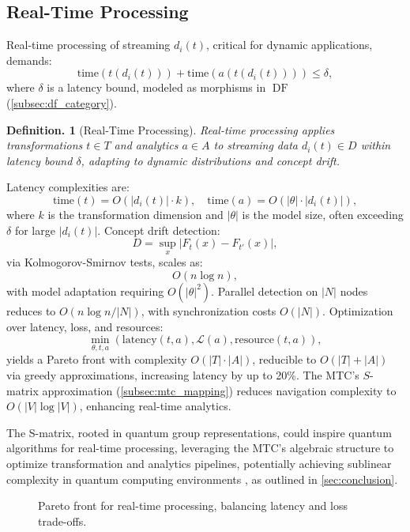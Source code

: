 \documentclass{amsart}
\newtheorem{defn}[thm]{Definition.}
\DeclareMathOperator\DF{DF}
\begin{document}
\subsection{Real-Time Processing} \label{subsec:realtime}
Real-time processing of streaming \( d_i(t) \), critical for dynamic applications, demands:
\[
\text{time}(t(d_i(t))) + \text{time}(a(t(d_i(t)))) \leq \delta,
\]
where \( \delta \) is a latency bound, modeled as morphisms in \( \DF \) (\cref{subsec:df_category}).

\begin{defn}[Real-Time Processing]
Real-time processing applies transformations \( t \in T \) and analytics \( a \in A \) to streaming data \( d_i(t) \in D \) within latency bound \( \delta \), adapting to dynamic distributions and concept drift.
\end{defn}

Latency complexities are:
\[
\text{time}(t) = O(|d_i(t)| \cdot k), \quad \text{time}(a) = O(|\theta| \cdot |d_i(t)|),
\]
where \( k \) is the transformation dimension and \( |\theta| \) is the model size, often exceeding \( \delta \) for large \( |d_i(t)| \). Concept drift detection:
\[
D = \sup_x |F_t(x) - F_{t'}(x)|,
\]
via Kolmogorov-Smirnov tests, scales as:
\[
O(n \log n),
\]
with model adaptation requiring \( O(|\theta|^2) \). Parallel detection on \( |N| \) nodes reduces to \( O(n \log n / |N|) \), with synchronization costs \( O(|N|) \). Optimization over latency, loss, and resources:
\[
\min_{\theta, t, a} \left( \text{latency}(t, a), \mathcal{L}(a), \text{resource}(t, a) \right),
\]
yields a Pareto front with complexity \( O(|T| \cdot |A|) \), reducible to \( O(|T| + |A|) \) via greedy approximations, increasing latency by up to 20\%. The MTC’s \( S \)-matrix approximation (\cref{subsec:mtc_mapping}) reduces navigation complexity to \( O(|V| \log |V|) \), enhancing real-time analytics.

The S-matrix, rooted in quantum group representations, could inspire quantum algorithms for real-time processing, leveraging the MTC’s algebraic structure to optimize transformation and analytics pipelines, potentially achieving sublinear complexity in quantum computing environments \cite{Turaev1994}, as outlined in \cref{sec:conclusion}.

\begin{figure}[h!]
    \centering
{}
    \caption{Pareto front for real-time processing, balancing latency and loss trade-offs.}
    \label{fig:pareto_front}
\end{figure}
\end{document}
